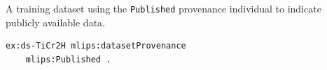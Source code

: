 A training dataset using the \texttt{Published} provenance individual to indicate publicly available data.
\begin{lstlisting}[language=turtle]
ex:ds-TiCr2H mlips:datasetProvenance
    mlips:Published .
\end{lstlisting}
